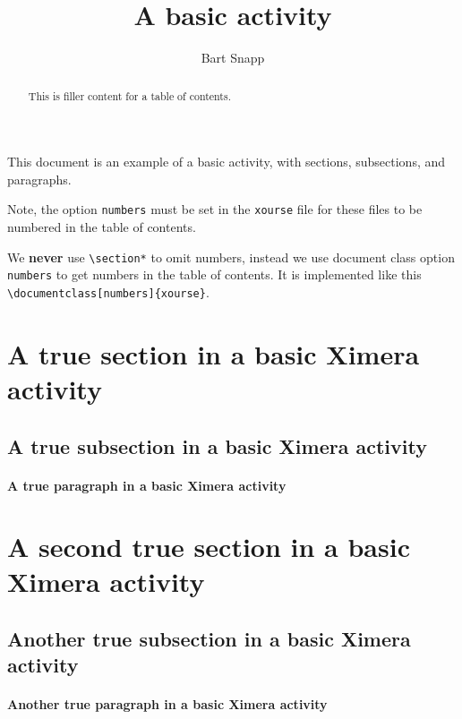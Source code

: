 \documentclass{ximera}
\author{Bart Snapp}
\title{A basic activity}
\begin{document}
\begin{abstract}
    This is filler content for a table of contents.
\end{abstract}
\maketitle

This document is an example of a basic activity, with sections, subsections, and paragraphs.


Note, the option \verb!numbers! must be set in the \verb!xourse! file for these
files to be numbered in the table of contents.

\begin{warning}
We \textbf{never} use \verb!\section*! to omit numbers, instead we use document class option \verb!numbers! to get numbers in the table of contents.
It is implemented like this \verb!\documentclass[numbers]{xourse}!.
\end{warning}



\section{A true section in a basic Ximera activity}
\lipsum[1]


\subsection{A true subsection in a basic Ximera activity}
\lipsum[1]

\paragraph{A true paragraph in a basic Ximera activity}
\lipsum[1]


\section{A second true section in a basic Ximera activity}
\lipsum[1]


\subsection{Another true subsection in a basic Ximera activity}
\lipsum[1]

\paragraph{Another true paragraph in a basic Ximera activity}
\lipsum[1]
\end{document}
